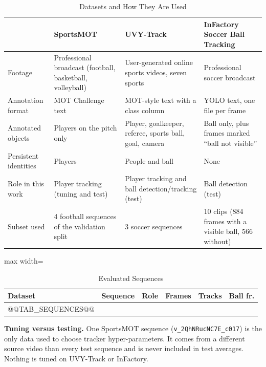 \documentclass[conference]{IEEEtran}
\begin{document}
\begin{table}[t]
\caption{Datasets and How They Are Used}
\label{tab:datasets}
\centering
\footnotesize
\begin{tabular}{@{}p{2.6cm}p{4.2cm}p{4.9cm}p{4.6cm}@{}}
\toprule
 & SportsMOT~\cite{sportsmot} & UVY-Track~\cite{uvy} & InFactory Soccer Ball Tracking~\cite{infactory} \\
\midrule
Footage & Professional broadcast (football, basketball, volleyball) & User-generated online sports videos, seven sports & Professional soccer broadcast \\
Annotation format & MOT Challenge text & MOT-style text with a class column & YOLO text, one file per frame \\
Annotated objects & Players on the pitch only & Player, goalkeeper, referee, sports ball, goal, camera & Ball only, plus frames marked ``ball not visible'' \\
Persistent identities & Players & People and ball & None \\
Role in this work & Player tracking (tuning and test) & Player tracking and ball detection/tracking (test) & Ball detection (test) \\
Subset used & 4 football sequences of the validation split & 3 soccer sequences & 10 clips (884 frames with a visible ball, 566 without) \\
\bottomrule
\end{tabular}
\end{table}

\begin{table}[t]
\caption{Evaluated Sequences}
\label{tab:sequences}
\centering
\footnotesize
\setlength{\tabcolsep}{3pt}
\begin{adjustbox}{max width=\columnwidth}
\begin{tabular}{@{}llcrrr@{}}
\toprule
Dataset & Sequence & Role & Frames & Tracks & Ball fr. \\
\midrule
@@TAB_SEQUENCES@@
\bottomrule
\end{tabular}
\end{adjustbox}
\end{table}

\textbf{Tuning versus testing.} One SportsMOT sequence
(\texttt{v\_2QhNRucNC7E\_c017}) is the only data used to choose tracker
hyper-parameters. It comes from a different source video than every test sequence
and is never included in test averages. Nothing is tuned on UVY-Track or
InFactory.
\end{document}
